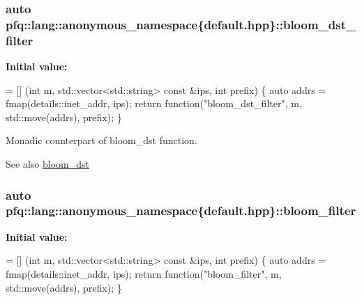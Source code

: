 \subsubsection[{\texorpdfstring{bloom\+\_\+dst\+\_\+filter}{bloom_dst_filter}}]{\setlength{\rightskip}{0pt plus 5cm}auto pfq\+::lang\+::anonymous\+\_\+namespace\{default.\+hpp\}\+::bloom\+\_\+dst\+\_\+filter}\hypertarget{namespacepfq_1_1lang_1_1anonymous__namespace_02default_8hpp_03_a71aa2d21ceb343786b3911801eb0741b}{}\label{namespacepfq_1_1lang_1_1anonymous__namespace_02default_8hpp_03_a71aa2d21ceb343786b3911801eb0741b}
{\bfseries Initial value\+:}
\begin{DoxyCode}
= [] (\textcolor{keywordtype}{int} m, std::vector<std::string> \textcolor{keyword}{const} &ips, \textcolor{keywordtype}{int} prefix) \{
                                    \textcolor{keyword}{auto} addrs = fmap(details::inet\_addr, ips);
                                    \textcolor{keywordflow}{return} \textcolor{keyword}{function}(\textcolor{stringliteral}{"bloom\_dst\_filter"}, m, std::move(addrs), prefix);
                                \}
\end{DoxyCode}


Monadic counterpart of {\ttfamily bloom\+\_\+dst} function. 

\begin{DoxySeeAlso}{See also}
\hyperlink{namespacepfq_1_1lang_1_1anonymous__namespace_02default_8hpp_03_ac1c667000a13acfbda8490d5748b91c4}{bloom\+\_\+dst} 
\end{DoxySeeAlso}
\subsubsection[{\texorpdfstring{bloom\+\_\+filter}{bloom_filter}}]{\setlength{\rightskip}{0pt plus 5cm}auto pfq\+::lang\+::anonymous\+\_\+namespace\{default.\+hpp\}\+::bloom\+\_\+filter}\hypertarget{namespacepfq_1_1lang_1_1anonymous__namespace_02default_8hpp_03_a3a5eda5d7a49e279941725df8388378d}{}\label{namespacepfq_1_1lang_1_1anonymous__namespace_02default_8hpp_03_a3a5eda5d7a49e279941725df8388378d}
{\bfseries Initial value\+:}
\begin{DoxyCode}
= [] (\textcolor{keywordtype}{int} m, std::vector<std::string> \textcolor{keyword}{const} &ips, \textcolor{keywordtype}{int} prefix) \{
                                    \textcolor{keyword}{auto} addrs = fmap(details::inet\_addr, ips);
                                    \textcolor{keywordflow}{return} \textcolor{keyword}{function}(\textcolor{stringliteral}{"bloom\_filter"}, m, std::move(addrs), prefix);
                                \}
\end{DoxyCode}


